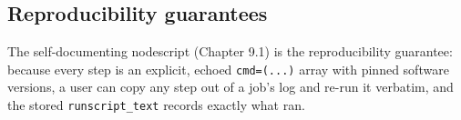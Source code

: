 \subsection{Reproducibility guarantees}

The self-documenting nodescript (Chapter 9.1) is the reproducibility guarantee: because every step is an
explicit, echoed \texttt{cmd=\allowbreak{}(.\allowbreak{}.\allowbreak{}.\allowbreak{})} array with pinned
software versions, a user can copy any step out of a job's log and re-run it verbatim, and the stored
\texttt{runscript\_\allowbreak{}text} records exactly what ran.
